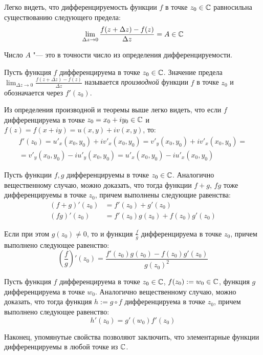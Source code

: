 \begin{note}
	Легко видеть, что дифференцируемость функции $f$ в точке $z_0 \in \mathbb{C}$ равносильна существованию следующего предела:
	\[\lim_{\Delta z \to 0}\frac{f(z + \Delta z) - f(z)}{\Delta z} = A \in \mathbb{C}\]
	
	Число $A$ "--- это в точности число из определения дифференцируемости.
\end{note}

\begin{definition}
	Пусть функция $f$ дифференцируема в точке $z_0 \in \mathbb{C}$. Значение предела $\lim_{\Delta z \to 0}\frac{f(z + \Delta z) - f(z)}{\Delta z}$ называется \textit{производной} функции $f$ в точке $z_0$ и обозначается через $f'(z_0)$.
\end{definition}

\begin{note}
	Из определения производной и теоремы выше легко видеть, что если $f$ дифференцируема в точке $z_0 = x_0 + iy_0 \in \mathbb{C}$ и $f(z) = f(x + iy) = u(x, y) + iv(x, y)$, то:
	\begin{multline*}
		f'(z_0) = u'_x(x_0, y_0) + iv'_x(x_0, y_0) = v'_y(x_0, y_0) + iv'_x(x_0, y_0) =
		\\
		= v'_y(x_0, y_0) - iu'_y(x_0, y_0) = u'_x(x_0, y_0) - iu'_x(x_0, y_0)
	\end{multline*}
\end{note}

\begin{note}
	Пусть функции $f, g$ дифференцируемы в точке $z_0 \in \mathbb{C}$. Аналогично вещественному случаю, можно доказать, что тогда функции $f + g$, $fg$ тоже дифференцируемы в точке $z_0$, причем выполнены следующие равенства:
	\begin{align*}
		(f + g)'(z_0) &= f'(z_0) + g'(z_0)\\
		(fg)'(z_0) &= f'(z_0)g(z_0) + f(z_0)g'(z_0)
	\end{align*}
	
	Если при этом $g(z_0) \ne 0$, то и функция $\frac fg$ дифференцируема в точке $z_0$, причем выполнено следующее равенство:
	\[
	\left(\frac fg\right)'(z_0) = \frac{f'(z_0)g(z_0) - f(z_0)g'(z_0)}{g(z_0)^2}\]
\end{note}

\begin{note}
	Пусть функция $f$ дифференцируема в точке $z_0 \in \mathbb{C}$, $f(z_0) := w_0 \in \mathbb{C}$, функция $g$ дифференцируема в точке $w_0$. Аналогично вещественному случаю, можно доказать, что тогда функция $h := g \circ f$ дифференцируема в точке $z_0$, причем выполнено следующее равенство:
	\[h'(z_0) = g'(w_0)f'(z_0)\]
	
	Наконец, упомянутые свойства позволяют заключить, что элементарные функции дифференцируемы в любой точке из $\mathbb{C}$.
\end{note}

